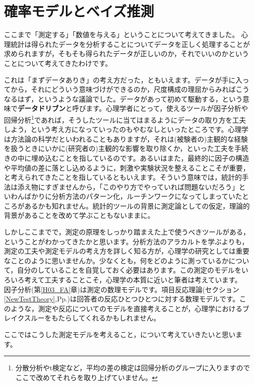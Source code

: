 \documentclass{ltjsbook}
\begin{document}
\chapter{確率モデルとベイズ推測}
\label{H10_Bayesian}

ここまで「測定する」「数値を与える」ということについて考えてきました。
心理統計は得られたデータを分析することについてデータを正しく処理することが求められますが，そもそも得られたデータが正しいのか，それでいいのかということについて考えてきたわけです。

これは「まずデータありき」の考え方だった，ともいえます。データが手に入ってから，それにどういう意味づけができるのか，尺度構成の理屈からみればこうなるはず，というような議論でした。データがあって初めて駆動する，という意味で\textbf{データドリブン}と呼びます。心理学者にとって，使えるツールが因子分析や回帰分析\footnote{分散分析やt検定など，平均の差の検定は回帰分析のグループに入りますのでここで改めてそれらを取り上げていません。}であれば，そうしたツールに当てはまるようにデータの取り方を工夫しよう，という考え方になっていったのもやむなしといったところです。心理学は方法論の科学だといわれることもありますが，それは(被験者の)主観的な経験を扱うときにいかに(研究者の)主観的な影響を取り除くか，といった工夫を手続きの中に埋め込むことを指しているのです。あるいはまた，最終的に因子の構造や平均値の差に落とし込めるように，刺激や実験状況を整えることこそが重要，と考えられてきたことを指しているともいえます。そういう意味では，統計的手法は添え物にすぎませんから，「このやり方でやっていれば問題ないだろう」といわんばかりに分析方法のパターン化，ルーチンワークになってしまっていたところがあるかも知れません。統計的ツールの背景に測定論としての仮定，理論的背景があることを改めて学ぶこともないままに。

しかしここまでで，測定の原理をしっかり踏まえた上で使うべきツールがある，ということがわかってきたかと思います。分析方法のアラカルトを学ぶよりも，測定の工夫や測定モデルの考え方を詳しく知る方が，心理学の研究としては重要なことのように思いませんか。少なくとも，何をどのように測っているかについて，自分のしていることを自覚しておく必要はあります。この測定のモデルをいろいろ考えて工夫することこそ，心理学の本質に近いと筆者は考えています。
因子分析(第\ref{H03_FA}章)は測定の数理モデルです。項目反応理論(セクション\ref{NewTestTheory},Pp.\pageref{NewTestTheory})は回答者の反応ひとつひとつに対する数理モデルです。このような，測定や反応についてのモデルを直接考えることが，心理学におけるブレイクスルーをもたらしてくれるかもしれません。

ここではこうした測定モデルを考えること，について考えていきたいと思います。
\end{document}

